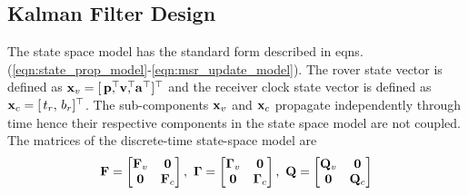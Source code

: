 \subsection{Kalman Filter Design}
The state space model has the standard form described in eqns. (\ref{eqn:state_prop_model}-\ref{eqn:msr_update_model}). 
The rover state vector is defined as
$\Boldx_v = [\,\Boldp^\top \!\!\!\!,  \, \Boldv^\top \!\!\!\!, \, \Bolda^\top]^\top$ 
and the receiver clock state vector is defined as $\mathbf{x}_c = [\,t_r, \, b_r]^\top$.
The sub-components $\mathbf{x}_v$ and $\mathbf{x}_c$ propagate independently through time hence their respective components in the state space model are not coupled.
The matrices of the discrete-time state-space model are
\begin{align}
	\mathbf{F} = \begin{bmatrix} \mathbf{F}_v & \boldsymbol{0} \\ \boldsymbol{0} & \mathbf{F}_c \end{bmatrix}, ~
	\boldsymbol{\Gamma} = \begin{bmatrix} \boldsymbol{\Gamma}_v & \boldsymbol{0} \\ \boldsymbol{0} & \boldsymbol{\Gamma}_c	\end{bmatrix}, ~
	\mathbf{Q} = \begin{bmatrix} \mathbf{Q}_v & \boldsymbol{0} \\ \boldsymbol{0} & \mathbf{Q}_c \end{bmatrix}
\end{align}

